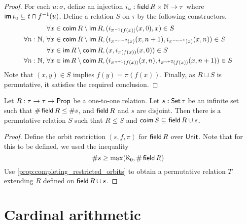 \begin{proof}
  \leanok
  For each \( u : \sigma \), define an injection \( i_u : \operatorname{\mathsf{field}} R \times \mathbb N \to \tau \) where \( \operatorname{\mathsf{im}} i_u \subseteq t \cap f^{-1}(u) \).
  Define a relation \( S \) on \( \tau \) by the following constructors.
  \begin{align*}
    \forall x \in \operatorname{\mathsf{coim}} R \setminus \operatorname{\mathsf{im}} R,\, &(i_{\pi^{-1}(f(x))}(x, 0), x) \in S \\
    \forall n : \mathbb N,\, \forall x \in \operatorname{\mathsf{coim}} R \setminus \operatorname{\mathsf{im}} R,\, &(i_{\pi^{-n-2}(x)}(x, n+1), i_{\pi^{-n-1}(x)}(x, n)) \in S \\
    \forall x \in \operatorname{\mathsf{im}} R \setminus \operatorname{\mathsf{coim}} R,\, &(x, i_{\pi(f(x))}(x, 0)) \in S \\
    \forall n : \mathbb N,\, \forall x \in \operatorname{\mathsf{im}} R \setminus \operatorname{\mathsf{coim}} R,\, &(i_{\pi^{n+1}(f(x))}(x, n), i_{\pi^{n+2}(f(x))}(x, n+1)) \in S
  \end{align*}
  Note that \( (x, y) \in S \) implies \( f(y) = \pi(f(x)) \).
  Finally, as \( R \sqcup S \) is permutative, it satisfies the required conclusion.
\end{proof}
\begin{proposition}
  \label{prop:completing_orbits}
  \leanok
  Let \( R : \tau \to \tau \to \mathsf{Prop} \) be a one-to-one relation.
  Let \( s : \operatorname{\mathsf{Set}} \tau \) be an infinite set such that \( \#\operatorname{\mathsf{field}} R \leq \#s \), and \( \operatorname{\mathsf{field}} R \) and \( s \) are disjoint.
  Then there is a permutative relation \( S \) such that \( R \leq S \) and \( \operatorname{\mathsf{coim}} S \subseteq \operatorname{\mathsf{field}} R \cup s \).
\end{proposition}
\begin{proof}
  \leanok
  Define the orbit restriction \( (s, f, \pi) \) for \( \operatorname{\mathsf{field}} R \) over \( \mathsf{Unit} \).
  Note that for this to be defined, we used the inequality
  \[ \#s \geq \max(\aleph_0, \#\operatorname{\mathsf{field}} R) \]
  Use \cref{prop:completing_restricted_orbits} to obtain a permutative relation \( T \) extending \( R \) defined on \( \operatorname{\mathsf{field}} R \cup s \).
\end{proof}

\section{Cardinal arithmetic}

